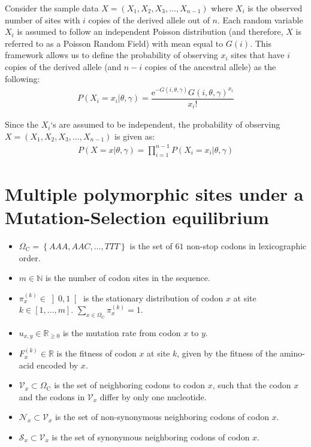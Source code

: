 \documentclass{article}
\newcommand{\e}{\mathrm{e}}
\newcommand{\SetCodon}{\Omega_{\mathrm{C}}}
\newcommand{\Neighbor}{\mathcal{V}}
\newcommand{\NonSyn}{\mathcal{N}}
\newcommand{\Syn}{\mathcal{S}}
\newcommand{\Nx}{\Neighbor_x}
\newcommand{\NxNonSyn}{\NonSyn_x}
\newcommand{\NxSyn}{\Syn_x}
\begin{document}
Consider the sample data $X = (X_1, X_2, X_3, \hdots , X_{n-1})$ where $X_i$ is the observed number of sites with $i$ copies of the derived allele out of $n$. Each random variable $X_i$ is assumed to follow an independent Poisson distribution (and therefore, $X$ is referred to as a Poisson
Random Field) with mean equal to $G(i)$. This framework allows us to define the
probability of observing $x_i$ sites that have $i$ copies of the derived allele (and $n-i$ copies of the ancestral allele) as the following:
\begin{eqnarray*}
	P(X_i = x_i | \theta, \gamma) = \dfrac{\e^{-G(i, \theta, \gamma)} G(i, \theta, \gamma)^{x_i}}{x_i!}
\end{eqnarray*}

Since the $X_i$‘s are assumed to be independent, the probability of observing $X = (X_1, X_2, X_3, \hdots , X_{n-1})$ is given as:
\begin{eqnarray*}
	P(X = x | \theta, \gamma) = \prod_{i=1}^{n-1}P(X_i = x_i | \theta, \gamma)
\end{eqnarray*}

\newpage

\section*{Multiple polymorphic sites under a Mutation-Selection equilibrium}
\begin{itemize}
	\setlength\itemsep{-0.2em}
	\item $\SetCodon = \left\{ AAA,AAC, \dots, TTT \right\} $ is the set of $61$ non-stop codons in lexicographic order.
	\item $m \in \mathbb{N}$ is the number of codon sites in the sequence.
	\item $\pi_x^{(k)} \in \left]0,1\right[ $ is the stationary distribution of codon $x$ at site $k \in [1, \hdots, m] $. $\sum_{x \in \SetCodon} \pi_x^{(k)} = 1$. 
	\item $u_{x,y} \in \mathbb{R}_{\geq 0} $ is the mutation rate from codon $x$ to $y$. 
	\item $F_x^{(k)} \in \mathbb{R} $ is the fitness of codon $x$ at site $k$, given by the fitness of the amino-acid encoded by $x$.
	\item $\Nx \subset \SetCodon $ is the set of neighboring codons to codon $x$, such that the codon $x$ and the codons in $\Nx$ differ by only one nucleotide.
    \item $\NxNonSyn \subset \Nx $ is the set of non-synonymous neighboring codons of codon $x$.
	\item $\NxSyn \subset \Nx $ is the set of synonymous neighboring codons of codon $x$.
\end{itemize}
\end{document}
